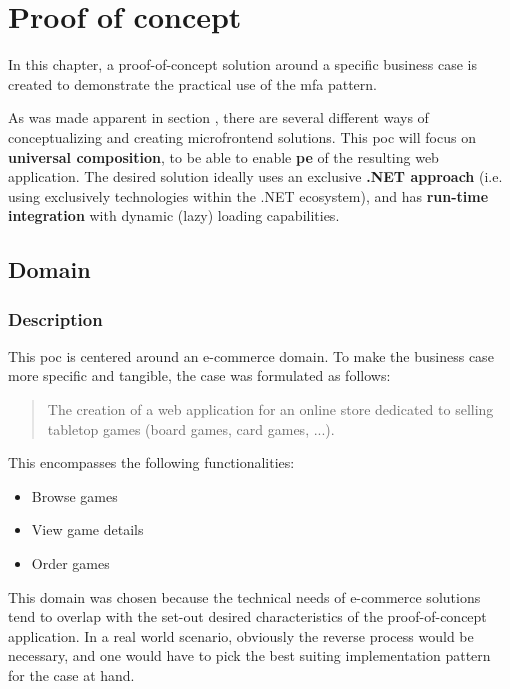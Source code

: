 
\chapter{Proof of concept}
\label{ch:proof-of-concept}

In this chapter, a proof-of-concept solution around a specific business case is
created to demonstrate the practical use of the \gls{mfa} pattern.

As was made apparent in section , there
are several different ways of conceptualizing and creating \gls{microfrontend}
solutions. This \gls{poc} will focus on \textbf{universal composition}, to be
able to enable \textbf{\gls{pe}} of the resulting web application. The desired
solution ideally uses an exclusive \textbf{.NET approach} (i.e. using
exclusively technologies within the .NET ecosystem), and has \textbf{run-time
integration} with dynamic (lazy) loading capabilities.


\section{Domain}
\subsection{Description}

This \gls{poc} is centered around an e-commerce domain. To make the
business case more specific and tangible, the case was formulated as
follows:

\begin{quote}
  The creation of a web application for an online store dedicated to selling
  tabletop games (board games, card games, ...).
\end{quote}

This encompasses the following functionalities:
\begin{itemize}
  \item Browse games
  \item View game details
  \item Order games
\end{itemize}

This domain was chosen because the technical needs of e-commerce solutions tend
to overlap with the set-out desired characteristics of the proof-of-concept
application. In a real world scenario, obviously the reverse process would be
necessary, and one would have to  pick the best suiting implementation pattern
for the case at hand. 

